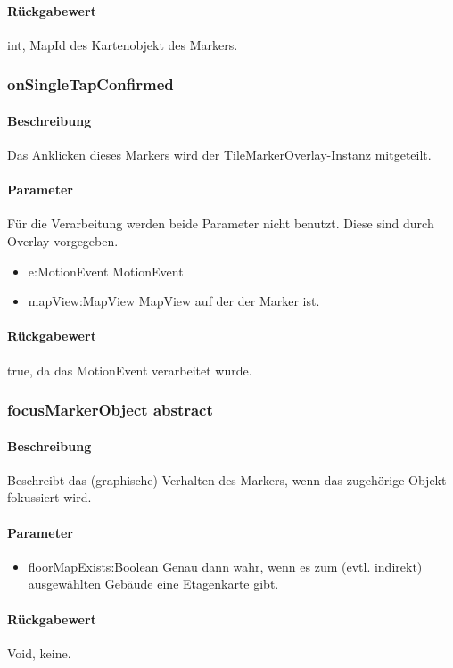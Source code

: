 \paragraph*{Rückgabewert}
int, MapId des Kartenobjekt des Markers.

\subsubsection{onSingleTapConfirmed}%
\paragraph*{Beschreibung}
Das Anklicken dieses Markers wird der TileMarkerOverlay-Instanz mitgeteilt.
\paragraph*{Parameter}
Für die Verarbeitung werden beide Parameter nicht benutzt. Diese sind durch Overlay vorgegeben.
\begin{itemize}
    \item e:MotionEvent MotionEvent
    \item mapView:MapView MapView auf der der Marker ist.
\end{itemize}
\paragraph*{Rückgabewert}
true, da das MotionEvent verarbeitet wurde.

\subsubsection{focusMarkerObject {abstract}}%
\paragraph*{Beschreibung}
Beschreibt das (graphische) Verhalten des Markers, wenn das zugehörige Objekt fokussiert wird.
\paragraph*{Parameter}
\begin{itemize}
    \item floorMapExists:Boolean Genau dann wahr, wenn es zum (evtl. indirekt) ausgewählten Gebäude eine Etagenkarte gibt.
\end{itemize}
\paragraph*{Rückgabewert}
Void, keine.

